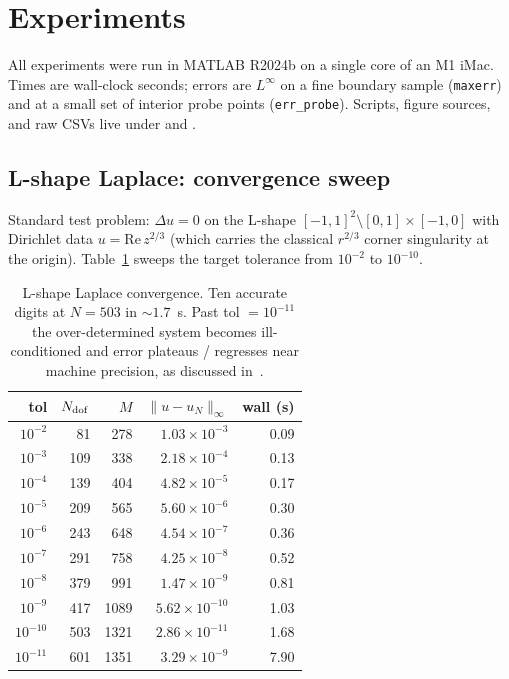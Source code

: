 \documentclass[11pt]{article}
\begin{document}
\section{Experiments}

All experiments were run in MATLAB R2024b on a single core of an M1 iMac. Times
are wall-clock seconds; errors are $L^\infty$ on a fine boundary sample
(\texttt{maxerr}) and at a small set of interior probe points
(\texttt{err\_probe}). Scripts, figure sources, and raw CSVs live under
 and .

\subsection{L-shape Laplace: convergence sweep}
\label{sec:exp1}

Standard test problem: $\Delta u = 0$ on the L-shape
$[-1,1]^2 \setminus [0,1]\times[-1,0]$ with Dirichlet data
$u = \mathrm{Re}\,z^{2/3}$ (which carries the classical $r^{2/3}$ corner
singularity at the origin). Table~\ref{tab:exp1} sweeps the target tolerance
from $10^{-2}$ to $10^{-10}$.

\begin{table}[h]
\centering
\small
\begin{tabular}{rrrrr}
\toprule
tol & $N_{\rm dof}$ & $M$ & $\|u-u_N\|_\infty$ & wall (s) \\
\midrule
$10^{-2}$  &  81 & 278  & $1.03\times 10^{-3}$  & 0.09 \\
$10^{-3}$  & 109 & 338  & $2.18\times 10^{-4}$  & 0.13 \\
$10^{-4}$  & 139 & 404  & $4.82\times 10^{-5}$  & 0.17 \\
$10^{-5}$  & 209 & 565  & $5.60\times 10^{-6}$  & 0.30 \\
$10^{-6}$  & 243 & 648  & $4.54\times 10^{-7}$  & 0.36 \\
$10^{-7}$  & 291 & 758  & $4.25\times 10^{-8}$  & 0.52 \\
$10^{-8}$  & 379 & 991  & $1.47\times 10^{-9}$  & 0.81 \\
$10^{-9}$  & 417 &1089  & $5.62\times 10^{-10}$ & 1.03 \\
$10^{-10}$ & 503 &1321  & $2.86\times 10^{-11}$ & 1.68 \\
$10^{-11}$ & 601 &1351  & $3.29\times 10^{-9}$  & 7.90 \\
\bottomrule
\end{tabular}
\caption{L-shape Laplace convergence. Ten accurate digits at $N=503$ in
$\sim\!1.7$~s. Past tol $=10^{-11}$ the over-determined system becomes
ill-conditioned and error plateaus / regresses near machine precision, as
discussed in~\cite[Fig.~3]{gopal2019}.}
\label{tab:exp1}
\end{table}
\end{document}
